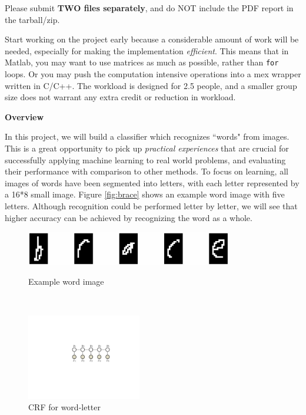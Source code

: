 \documentclass[11pt]{report}
\begin{document}
	Please submit {\bf TWO files separately}, and do NOT include the PDF report in the tarball/zip.
	
	
	Start working on the project early
	because a considerable amount of work will be needed,
	especially for making the implementation \emph{efficient}.
	This means that in Matlab, you may want to use matrices as much as possible,
	rather than \verb#for# loops.
	Or you may push the computation intensive operations into a mex wrapper written in C/C++.
	The workload is designed for 2.5 people, and a smaller group size  does not warrant any extra credit or reduction in workload.
	
	
	
	
	{\bf \large Overview}
	
	
	
	
	In this project, we will build a classifier which recognizes ``words" from images.
	This is a great opportunity to pick up \emph{practical experiences} that are crucial for successfully applying machine learning to real world problems,
	and evaluating their performance with comparison to other methods.
	To focus on learning, all images of words have been segmented into letters,
	with each letter represented by a 16*8 small image.
	Figure \ref{fig:brace} shows an example word image with five letters.
	Although recognition could be performed letter by letter,
	we will see that higher accuracy can be achieved by recognizing the word as a whole.
	
	
	\begin{figure}[t!]
		\begin{minipage}[b]{0.62\textwidth}
			\centering
			\vspace{-0.6em}
			\includegraphics[width=9cm]{brace.jpg}
			\vspace{0.6em}
			\caption{Example word image}\label{fig:brace}
		\end{minipage}
		~~~
		\begin{minipage}[b]{0.33\textwidth}
			\centering
			\includegraphics[width=5cm]{crf}
			\caption{CRF for word-letter}\label{fig:CRF_model}
		\end{minipage}
	\end{figure}
	
\end{document}
